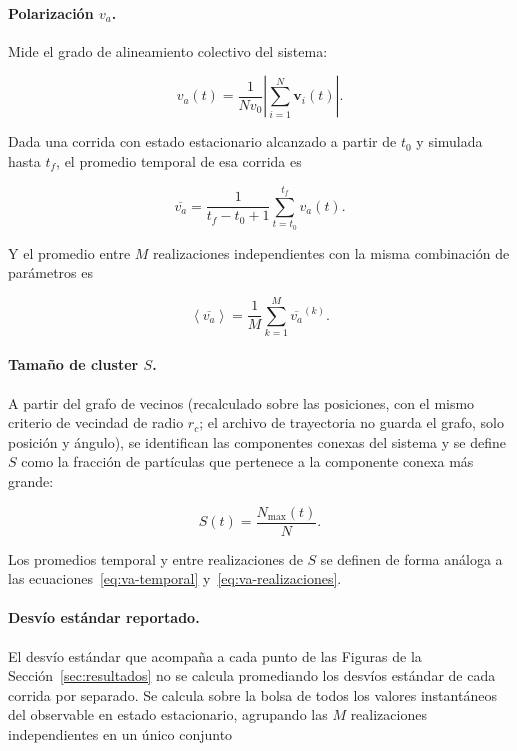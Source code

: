 \documentclass[a4paper,11pt]{article}
\begin{document}
\paragraph{Polarización $v_a$.} Mide el grado de alineamiento colectivo del
sistema:

\begin{equation}
  v_a(t) = \frac{1}{N v_0}\left|\sum_{i=1}^{N}\bm{v}_i(t)\right|.
  \label{eq:va}
\end{equation}

Dada una corrida con estado estacionario alcanzado a partir de $t_0$ y
simulada hasta $t_f$, el promedio temporal de esa corrida es

\begin{equation}
  \overline{v_a} = \frac{1}{t_f - t_0 + 1}\sum_{t=t_0}^{t_f} v_a(t).
  \label{eq:va-temporal}
\end{equation}

Y el promedio entre $M$ realizaciones independientes con la misma
combinación de parámetros es

\begin{equation}
  \left\langle \overline{v_a} \right\rangle = \frac{1}{M}\sum_{k=1}^{M} \overline{v_a}^{(k)}.
  \label{eq:va-realizaciones}
\end{equation}

\paragraph{Tamaño de cluster $S$.} A partir del grafo de vecinos (recalculado
sobre las posiciones, con el mismo criterio de vecindad de radio $r_c$; el
archivo de trayectoria no guarda el grafo, solo posición y ángulo), se
identifican las componentes conexas del sistema y se define $S$ como la
fracción de partículas que pertenece a la componente conexa más grande:

\begin{equation}
  S(t) = \frac{N_{\max}(t)}{N}.
  \label{eq:s}
\end{equation}

Los promedios temporal y entre realizaciones de $S$ se definen de forma
análoga a las ecuaciones~\eqref{eq:va-temporal} y~\eqref{eq:va-realizaciones}.

\paragraph{Desvío estándar reportado.} El desvío estándar que acompaña a cada
punto de las Figuras de la Sección~\ref{sec:resultados} no se calcula
promediando los desvíos estándar de cada corrida por separado. Se calcula
sobre la bolsa de todos los valores instantáneos del observable en estado
estacionario, agrupando las $M$ realizaciones independientes en un único
conjunto
\end{document}
